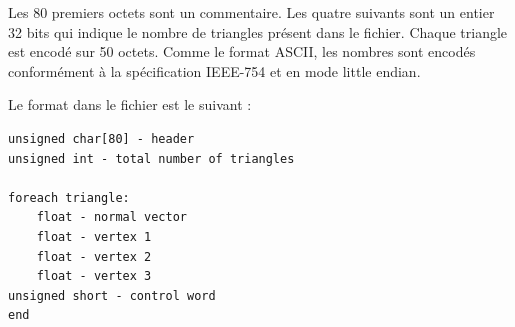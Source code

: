 Les 80 premiers octets sont un commentaire. Les quatre suivants sont un entier 32 bits qui indique le nombre de triangles présent dans le fichier.
Chaque triangle est encodé sur 50 octets. Comme le format ASCII, les nombres sont encodés conformément à la spécification IEEE-754 et en mode little endian.

Le format dans le fichier est le suivant : 

\begin{lstlisting}[frame=single]
unsigned char[80] - header
unsigned int - total number of triangles

foreach triangle:
    float - normal vector
    float - vertex 1
    float - vertex 2
    float - vertex 3
unsigned short - control word
end
\end{lstlisting}